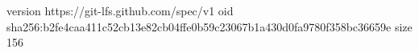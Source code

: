 version https://git-lfs.github.com/spec/v1
oid sha256:b2fe4caa411c52cb13e82cb04ffe0b59c23067b1a430d0fa9780f358bc36659e
size 156
